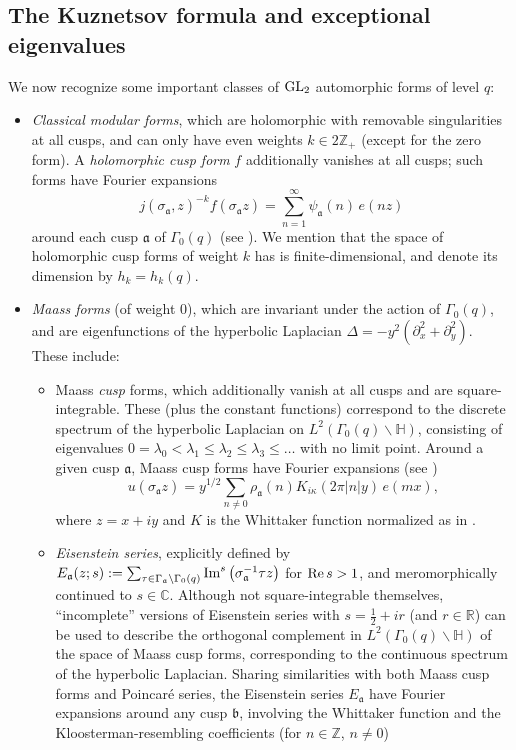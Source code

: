 \documentclass[reqno,11pt]{amsart}
\theoremstyle{remark}
\numberwithin{equation}{section}
\newcommand{\Z}{\mathbb{Z}}
\newcommand{\R}{\mathbb{R}}
\newcommand{\C}{\mathbb{C}}
\renewcommand{\H}{\mathbb{H}}
\newcommand{\ma}{\mathfrak{a}}
\newcommand{\mb}{\mathfrak{b}}
\renewcommand{\Re}{\textnormal{Re}}
\renewcommand{\Im}{\textnormal{Im}}
\newcommand{\GL}{\textnormal{GL}}
\begin{document}
\subsection{The Kuznetsov formula and exceptional eigenvalues}

We now recognize some important classes of $\GL_2$ automorphic forms of level $q$: 
\begin{itemize}
    \item[(1).] \emph{Classical modular forms}, which are holomorphic with removable singularities at all cusps, and can only have even weights $k \in 2\Z_+$ (except for the zero form). A \emph{holomorphic cusp form} $f$ additionally vanishes at all cusps; such forms have Fourier expansions
    \begin{equation} \label{eq:expansion-holomorphic}
        j(\sigma_\ma, z)^{-k} f(\sigma_{\ma} z) = \sum_{n=1}^\infty \psi_\ma(n)\, e(n z)
    \end{equation}
    around each cusp $\ma$ of $\Gamma_0(q)$ (see \cite[(1.7)]{deshouillers1982kloosterman}). We mention that the space of holomorphic cusp forms of weight $k$ has is finite-dimensional, and denote its dimension by $h_k = h_k(q)$.
    \item[(2).] \emph{Maass forms} (of weight $0$), which are invariant under the action of $\Gamma_0(q)$, and are eigenfunctions of the hyperbolic Laplacian $\Delta = -y^2 \left(\partial_x^2 + \partial_y^2\right)$. These include:
    \begin{itemize}
        \item[(a).] Maass \emph{cusp} forms, which additionally vanish at all cusps and are square-integrable. These (plus the constant functions) correspond to the discrete spectrum of the hyperbolic Laplacian on $L^2\left(\Gamma_0(q) \backslash \H\right)$, consisting of eigenvalues $0 = \lambda_0 < \lambda_1 \le \lambda_2 \le \lambda_3 \le \ldots$ with no limit point. Around a given cusp $\ma$, Maass cusp forms have Fourier expansions (see \cite[(1.15)]{deshouillers1982kloosterman})
        \begin{equation} \label{eq:expansion-Maass}
            u(\sigma_{\ma} z) = y^{1/2} \sum_{n \neq 0} \rho_{\ma}(n) K_{i\kappa}(2\pi |n| y)\, e(mx),
        \end{equation}
        where $z = x + iy$ and $K$ is the Whittaker function normalized as in \cite[p.\,264]{deshouillers1982kloosterman}.
        \item[(b).] \emph{Eisenstein series}, explicitly defined by $E_\ma(z; s) := \sum_{\tau \in \Gamma_\ma \backslash \Gamma_0(q)} \Im^s\left(\sigma_{\ma}^{-1} \tau z\right)$ for $\Re\, s > 1$, and meromorphically continued to $s \in \C$. Although not square-integrable themselves, ``incomplete'' versions of Eisenstein series with $s = \frac{1}{2} + ir$ (and $r \in \R$) can be used to describe the orthogonal complement in $L^2\left(\Gamma_0(q) \backslash \H\right)$ of the space of Maass cusp forms, corresponding to the continuous spectrum of the hyperbolic Laplacian. Sharing similarities with both Maass cusp forms and Poincar\'e series, the Eisenstein series $E_\ma$ have Fourier expansions \cite[(1.17)]{deshouillers1982kloosterman} around any cusp $\mb$, involving the Whittaker function and the Kloosterman-resembling coefficients (for $n \in \Z$, $n \neq 0$)

\end{itemize}
\end{itemize}
\end{document}
